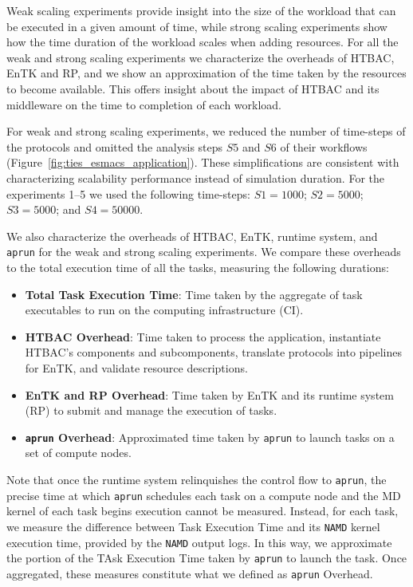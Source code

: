 Weak scaling experiments provide insight into the size of the workload that
can be executed in a given amount of time, while strong scaling experiments
show how the time duration of the workload scales when adding resources. For
all the weak and strong scaling experiments we characterize the overheads of
HTBAC, EnTK and RP, and we show an approximation of the time taken by the
resources to become available. This offers insight about the impact of HTBAC
and its middleware on the time to completion of each workload.

For weak and strong scaling experiments, we reduced the number of time-steps
of the protocols and omitted the analysis steps $S5$ and $S6$ of their
workflows (Figure~\ref{fig:ties_esmacs_application}). These simplifications
are consistent with characterizing scalability performance instead of
simulation duration. For the experiments 1--5 we used the following
time-steps: $S1=1000$; $S2=5000$; $S3=5000$; and $S4=50000$.

We also characterize the overheads of HTBAC, EnTK, runtime system, and
\texttt{aprun} for the weak and strong scaling experiments. We compare
these overheads to the total execution time of all the tasks, measuring
the following durations:

\begin{itemize}
    \item \textbf{Total Task Execution Time}: Time taken by the aggregate of
    task executables to run on the computing infrastructure (CI).
    \item \textbf{HTBAC Overhead}: Time taken to process the application,
    instantiate HTBAC's components and subcomponents, translate protocols
    into pipelines for EnTK, and validate resource descriptions.
    \item \textbf{EnTK and RP Overhead}: Time taken by EnTK and its runtime
    system (RP) to submit and manage the execution of tasks.
    \item \textbf{\texttt{aprun} Overhead}: Approximated time taken by 
    \texttt{aprun} to launch tasks on a set of compute nodes.
\end{itemize}

Note that once the runtime system relinquishes the control flow to
\texttt{aprun}, the precise time at which \texttt{aprun} schedules each task
on a compute node and the MD kernel of each task begins execution cannot be
measured. Instead, for each task, we measure the difference between Task
Execution Time and its \texttt{NAMD} kernel execution time, provided by the
\texttt{NAMD} output logs. In this way, we approximate the portion of the
TAsk Execution Time taken by \texttt{aprun} to launch the task. Once
aggregated, these measures constitute what we defined as \texttt{aprun}
Overhead.


